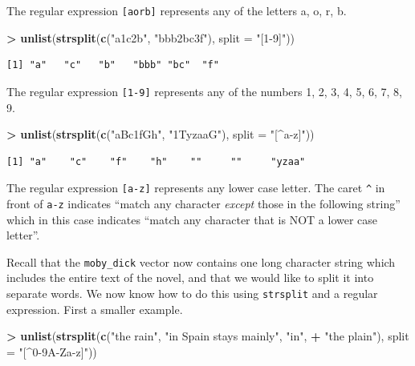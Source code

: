 \documentclass[]{krantz}
\makeatletter
\newenvironment{Shaded}{\begin{snugshade}}{\end{snugshade}}
\newcommand{\DataTypeTok}[1]{\textcolor[rgb]{0.27,0.27,0.27}{#1}}
\newcommand{\KeywordTok}[1]{\textcolor[rgb]{0.27,0.27,0.27}{\textbf{#1}}}
\newcommand{\NormalTok}[1]{#1}
\newcommand{\OperatorTok}[1]{\textcolor[rgb]{0.43,0.43,0.43}{\textbf{#1}}}
\newcommand{\StringTok}[1]{\textcolor[rgb]{0.5,0.5,0.5}{#1}}
\newenvironment{kframe}{%
\medskip{}
\setlength{\fboxsep}{.8em}
 \def\at@end@of@kframe{}%
 \ifinner\ifhmode%
  \def\at@end@of@kframe{\end{minipage}}%
  \begin{minipage}{\columnwidth}%
 \fi\fi%
 \def\FrameCommand##1{\hskip\@totalleftmargin \hskip-\fboxsep
 \colorbox{shadecolor}{##1}\hskip-\fboxsep
     \hskip-\linewidth \hskip-\@totalleftmargin \hskip\columnwidth}%
 \MakeFramed {\advance\hsize-\width
   \@totalleftmargin\z@ \linewidth\hsize
   \@setminipage}}%
 {\par\unskip\endMakeFramed%
 \at@end@of@kframe}
\renewenvironment{Shaded}{\begin{kframe}}{\end{kframe}}
\makeatother
\begin{document}
The regular expression \texttt{{[}aorb{]}} represents any of the letters a, o, r, b.

\begin{Shaded}
\begin{Highlighting}[]
\OperatorTok{>}\StringTok{ }\KeywordTok{unlist}\NormalTok{(}\KeywordTok{strsplit}\NormalTok{(}\KeywordTok{c}\NormalTok{(}\StringTok{"a1c2b"}\NormalTok{, }\StringTok{"bbb2bc3f"}\NormalTok{), }\DataTypeTok{split =} \StringTok{"[1-9]"}\NormalTok{))}
\end{Highlighting}
\end{Shaded}

\begin{verbatim}
[1] "a"   "c"   "b"   "bbb" "bc"  "f"  
\end{verbatim}

The regular expression \texttt{{[}1-9{]}} represents any of the numbers 1, 2, 3, 4, 5, 6, 7, 8, 9.

\begin{Shaded}
\begin{Highlighting}[]
\OperatorTok{>}\StringTok{ }\KeywordTok{unlist}\NormalTok{(}\KeywordTok{strsplit}\NormalTok{(}\KeywordTok{c}\NormalTok{(}\StringTok{"aBc1fGh"}\NormalTok{, }\StringTok{"1TyzaaG"}\NormalTok{), }\DataTypeTok{split =} \StringTok{"[^a-z]"}\NormalTok{))}
\end{Highlighting}
\end{Shaded}

\begin{verbatim}
[1] "a"    "c"    "f"    "h"    ""     ""     "yzaa"
\end{verbatim}

The regular expression \texttt{{[}a-z{]}} represents any lower case letter. The caret \texttt{\^{}} in front of \texttt{a-z} indicates ``match any character \emph{except} those in the following string'' which in this case indicates ``match any character that is NOT a lower case letter''.

Recall that the \texttt{moby\_dick} vector now contains one long character string which includes the entire text of the novel, and that we would like to split it into separate words. We now know how to do this using \texttt{strsplit} and a regular expression. First a smaller example.

\begin{Shaded}
\begin{Highlighting}[]
\OperatorTok{>}\StringTok{ }\KeywordTok{unlist}\NormalTok{(}\KeywordTok{strsplit}\NormalTok{(}\KeywordTok{c}\NormalTok{(}\StringTok{"the rain"}\NormalTok{, }\StringTok{"in Spain stays mainly"}\NormalTok{, }\StringTok{"in"}\NormalTok{, }
\OperatorTok{+}\StringTok{   "the plain"}\NormalTok{), }\DataTypeTok{split =} \StringTok{"[^0-9A-Za-z]"}\NormalTok{))}
\end{Highlighting}
\end{Shaded}
\end{document}
